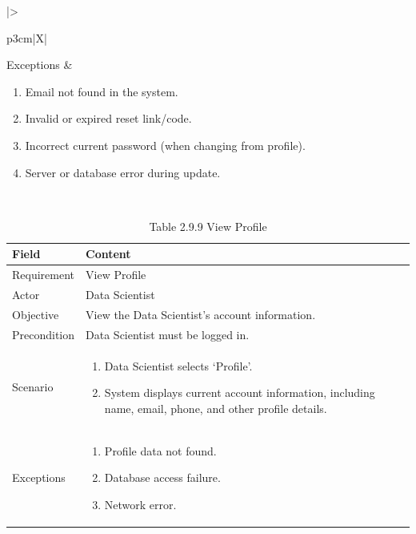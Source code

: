 \documentclass[12pt,oneside]{report}
\begin{document}
\begin{table}[H]
\begin{tabularx}{\textwidth}{|>{\raggedright\arraybackslash}p{3cm}|X|}
Exceptions &
\begin{minipage}[t]{\linewidth}
\begin{enumerate}[leftmargin=*,label=\arabic*.,itemsep=0pt,topsep=2pt]
  \item Email not found in the system.
  \item Invalid or expired reset link/code.
  \item Incorrect current password (when changing from profile).
  \item Server or database error during update.
\end{enumerate}
\end{minipage}
\\ \hline

\end{tabularx}
\end{table}


\begin{table}[H]
\centering
\caption{Table 2.9.9 View Profile}
\label{tab:ds-view-profile}
\begin{tabularx}{\textwidth}{|p{3cm}|X|}
\hline
\textbf{Field} & \textbf{Content} \\ \hline

Requirement & View Profile \\ \hline

Actor & Data Scientist \\ \hline

Objective & View the Data Scientist’s account information. \\ \hline

Precondition & Data Scientist must be logged in. \\ \hline

Scenario & 
\begin{minipage}[t]{0.75\textwidth}
\begin{enumerate}[leftmargin=*,label=\arabic*.]
\item Data Scientist selects ‘Profile’.
\item System displays current account information, including name, email, phone, and other profile details.
\end{enumerate}
\end{minipage} \\ \hline

Exceptions & 
\begin{minipage}[t]{0.75\textwidth}
\begin{enumerate}[leftmargin=*,label=\arabic*.]
\item Profile data not found.
\item Database access failure.
\item Network error.
\end{enumerate}
\end{minipage} \\ \hline

\end{tabularx}
\end{table}
\end{document}
